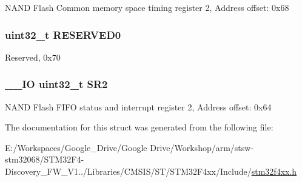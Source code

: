 N\-A\-N\-D Flash Common memory space timing register 2, Address offset\-: 0x68 \hypertarget{struct_f_s_m_c___bank2___type_def_af86c61a5d38a4fc9cef942a12744486b}{
\subsubsection[{R\-E\-S\-E\-R\-V\-E\-D0}]{\setlength{\rightskip}{0pt plus 5cm}uint32\-\_\-t R\-E\-S\-E\-R\-V\-E\-D0}}\label{struct_f_s_m_c___bank2___type_def_af86c61a5d38a4fc9cef942a12744486b}
Reserved, 0x70 \hypertarget{struct_f_s_m_c___bank2___type_def_a89623ee198737b29dc0a803310605a83}{
\subsubsection[{S\-R2}]{\setlength{\rightskip}{0pt plus 5cm}\-\_\-\-\_\-\-I\-O uint32\-\_\-t S\-R2}}\label{struct_f_s_m_c___bank2___type_def_a89623ee198737b29dc0a803310605a83}
N\-A\-N\-D Flash F\-I\-F\-O status and interrupt register 2, Address offset\-: 0x64 

The documentation for this struct was generated from the following file\-:\begin{DoxyCompactItemize}
\item 
E\-:/\-Workspaces/\-Google\-\_\-\-Drive/\-Google Drive/\-Workshop/arm/stsw-\/stm32068/\-S\-T\-M32\-F4-\/\-Discovery\-\_\-\-F\-W\-\_\-\-V1../\-Libraries/\-C\-M\-S\-I\-S/\-S\-T/\-S\-T\-M32\-F4xx/\-Include/\hyperlink{stm32f4xx_8h}{stm32f4xx.\-h}\end{DoxyCompactItemize}
